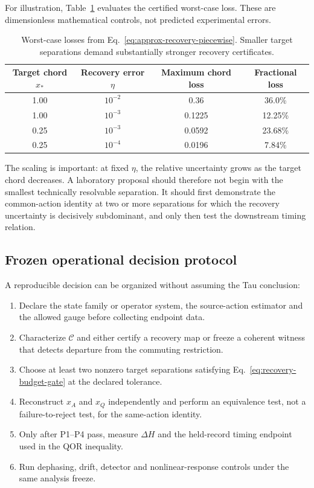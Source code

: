 \documentclass[11pt]{article}
\begin{document}
For illustration, Table~\ref{tab:recovery-budget} evaluates the certified
worst-case loss.  These are dimensionless mathematical controls, not predicted
experimental errors.

\begin{table}[t]
\centering
\small
\begin{tabular}{cccc}
\toprule
Target chord \(x_*\) & Recovery error \(\eta\) & Maximum chord loss & Fractional loss\\
\midrule
1.00 & \(10^{-2}\) & 0.36 & 36.0\%\\
1.00 & \(10^{-3}\) & 0.1225 & 12.25\%\\
0.25 & \(10^{-3}\) & 0.0592 & 23.68\%\\
0.25 & \(10^{-4}\) & 0.0196 & 7.84\%\\
\bottomrule
\end{tabular}
\caption{Worst-case losses from Eq.~\eqref{eq:approx-recovery-piecewise}.
Smaller target separations demand substantially stronger recovery
certificates.}
\label{tab:recovery-budget}
\end{table}

The scaling is important: at fixed \(\eta\), the relative uncertainty grows
as the target chord decreases.  A laboratory proposal should therefore not
begin with the smallest technically resolvable separation.  It should first
demonstrate the common-action identity at two or more separations for which
the recovery uncertainty is decisively subdominant, and only then test the
downstream timing relation.

\subsection{Frozen operational decision protocol}

A reproducible decision can be organized without assuming the Tau conclusion:
\begin{enumerate}[label=(P\arabic*)]
 \item Declare the state family or operator system, the source-action
 estimator and the allowed gauge before collecting endpoint data.
 \item Characterize \(\mathcal C\) and either certify a recovery map or freeze
 a coherent witness that detects departure from the commuting restriction.
 \item Choose at least two nonzero target separations satisfying
 Eq.~\eqref{eq:recovery-budget-gate} at the declared tolerance.
 \item Reconstruct \(x_A\) and \(x_Q\) independently and perform an equivalence
 test, not a failure-to-reject test, for the same-action identity.
 \item Only after P1--P4 pass, measure \(\Delta H\) and the held-record timing
 endpoint used in the QOR inequality.
 \item Run dephasing, drift, detector and nonlinear-response controls under the
 same analysis freeze.
\end{enumerate}
\end{document}
